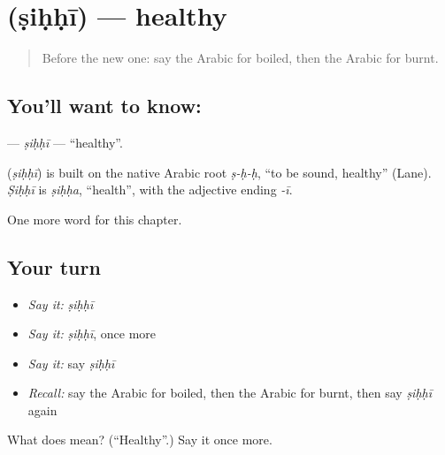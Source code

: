 \section[\texorpdfstring{\ar{صحي} (ṣiḥḥī)}{صحي (ṣiḥḥī)}]{ (ṣiḥḥī) — healthy}

\label{lesson:AR-C209-sihhi}



\begin{quote}
Before the new one: say the Arabic for boiled, then the Arabic for burnt.
\end{quote}

\subsection*{You'll want to know: }
\textbf{} — \emph{ṣiḥḥī} — \textquotedblleft{}healthy\textquotedblright{}.

\begin{cousinweb}
\textbf{} (\emph{ṣiḥḥī}) is built on the native Arabic root \emph{ṣ-ḥ-ḥ}, \textquotedblleft{}to be sound, healthy\textquotedblright{} (Lane). \emph{Ṣiḥḥī} is \emph{ṣiḥḥa}, \textquotedblleft{}health\textquotedblright{}, with the adjective ending \emph{-ī}.
\end{cousinweb}

\begin{grammarlens}[title={What you've built}]
One more word for this chapter.
\end{grammarlens}

\subsection*{Your turn}
\begin{itemize}
\raggedright
  \item \emph{Say it:} \emph{ṣiḥḥī}
  \item \emph{Say it:} \emph{ṣiḥḥī}, once more
  \item \emph{Say it:} say \emph{ṣiḥḥī}
  \item \emph{Recall:} say the Arabic for boiled, then the Arabic for burnt, then say \emph{ṣiḥḥī} again
\end{itemize}

\begin{tcolorbox}[breakable,colback=teal!4,colframe=teal!35!black,title={Before you move on}]
What does  mean? (\textquotedblleft{}Healthy\textquotedblright{}.) Say it once more.
\end{tcolorbox}
